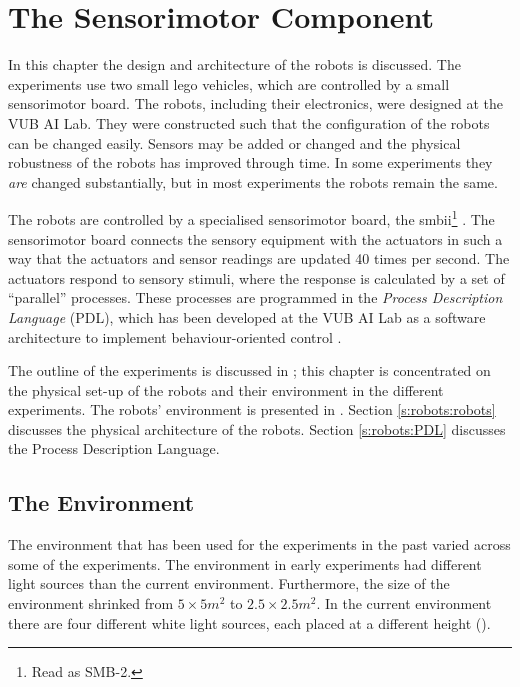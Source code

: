 \chapter{The Sensorimotor Component}\label{ch:robots}

In this chapter the design and architecture of the robots is discussed. The experiments use two small {\sc lego} vehicles, which are controlled by a small sensorimotor board. The robots, including their electronics, were designed at the VUB AI Lab. They were constructed such that the configuration of the robots can be changed easily. Sensors may be added or changed and the physical robustness of the robots has improved through time. In some experiments they {\it are} changed substantially, but in most experiments the robots remain the same.

The robots are controlled by a specialised sensorimotor board, the {\sc smbii}\footnote{Read as SMB-2.} \citep{vereertbrugghen:1996}. The sensorimotor board connects the sensory equipment with the actuators in such a way that the actuators and sensor readings are updated 40 times per second. The actuators respond to sensory stimuli, where the response is calculated by a set of ``parallel'' processes. These processes are programmed in the {\em Process Description Language} (PDL), which has been developed at the VUB AI Lab as a software architecture to implement behaviour-oriented control \citep{steels:1994b}. 

The outline of the experiments is discussed in ; this chapter is concentrated on the physical set-up of the robots and their environment in the different experiments. The robots' environment is presented in . Section \ref{s:robots:robots} discusses the physical architecture of the robots. Section \ref{s:robots:PDL} discusses the Process Description Language. 

\section{The Environment}\label{s:robots:envir}

The environment that has been used for the experiments in the past varied across some of the experiments. The environment in early experiments \citep{steelsvogt:1997,vogt:1998b,vogt:1998a} had different light sources than the current environment. Furthermore, the size of the environment shrinked from $5\times5 m^2$ to $2.5\times2.5 m^2$. In the current environment there are four different white light sources, each placed at a different height (). 


